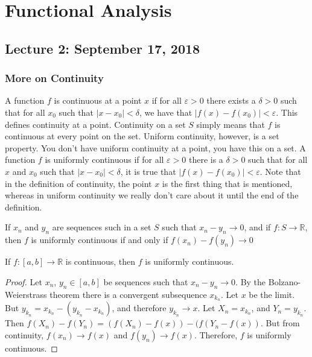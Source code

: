 \documentclass[crop=false,class=article,oneside]{standalone}
\begin{document}
    \ifx\ifmathcoursesfunctional\undefined
        \section*{Functional Analysis}
        \setcounter{section}{1}
    \fi
    \subsection{Lecture 2: September 17, 2018}
        \subsubsection{More on Continuity}
            A function $f$ is continuous at a point $x$ if
            for all $\varepsilon>0$ there exists a $\delta>0$
            such that for all $x_{0}$ such that
            $|x-x_{0}|<\delta$, we have that
            $|f(x)-f(x_{0})|<\varepsilon$. This defines
            continuity at a point. Continuity on a set
            $S$ simply means that $f$ is continuous
            at every point on the set. Uniform continuity,
            however, is a set property. You don't have
            uniform continuity at a point, you have this
            on a set. A function $f$ is uniformly continuous
            if for all $\varepsilon>0$ there is a $\delta>0$
            such that for all $x$ and $x_{0}$ such that
            $|x-x_{0}|<\delta$, it is true that
            $|f(x)-f(x_{0})|<\varepsilon$. Note that in
            the definition of continuity, the point $x$
            is the first thing that is mentioned, whereas in
            uniform continuity we really don't care about it
            until the end of the definition.
            \begin{theorem}
                If $x_{n}$ and $y_{n}$ are sequences such
                in a set $S$ such that $x_{n}-y_{n}\rightarrow{0}$,
                and if $f:{S}\rightarrow\mathbb{R}$, then
                $f$ is uniformly continuous if and only if
                $f(x_{n})-f(y_{n})\rightarrow{0}$
            \end{theorem}
            \begin{theorem}
                If $f:[a,b]\rightarrow\mathbb{R}$ is continuous,
                then $f$ is uniformly continuous.
            \end{theorem}
            \begin{proof}
                Let $x_{n}$, $y_{n}\in[a,b]$ be sequences such
                that $x_{n}-y_{n}\rightarrow{0}$. By the
                Bolzano-Weierstrass theorem there is a
                convergent subsequence $x_{k_{n}}$. Let $x$
                be the limit. But
                $y_{k_{n}}=x_{k_{n}}-(y_{k_{n}}-x_{k_{n}})$,
                and therefore $y_{k_{n}}\rightarrow{x}$.
                Let $X_{n}=x_{k_{n}}$, and $Y_{n}=y_{k_{n}}$.
                Then
                $f(X_{n})-f(Y_{n})%
                 =(f(X_{n})-f(x))-(f(Y_{n}-f(x))$.
                But from continuity, $f(x_{n})\rightarrow{f(x)}$
                and $f(y_{n})\rightarrow{f(x)}$. Therefore, $f$
                is uniformly continuous.
            \end{proof}
\end{document}
